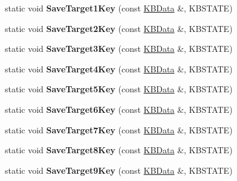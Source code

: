 \begin{DoxyCompactItemize}
\item 
static void {\bfseries Save\+Target1\+Key} (const \hyperlink{classKBData}{K\+B\+Data} \&, K\+B\+S\+T\+A\+TE)\hypertarget{classFireKeyboard_af458e85fe3e262506f9a80bd349af5ac}{}\label{classFireKeyboard_af458e85fe3e262506f9a80bd349af5ac}

\item 
static void {\bfseries Save\+Target2\+Key} (const \hyperlink{classKBData}{K\+B\+Data} \&, K\+B\+S\+T\+A\+TE)\hypertarget{classFireKeyboard_a783bca6e88df52b382c6bcb89835b9d7}{}\label{classFireKeyboard_a783bca6e88df52b382c6bcb89835b9d7}

\item 
static void {\bfseries Save\+Target3\+Key} (const \hyperlink{classKBData}{K\+B\+Data} \&, K\+B\+S\+T\+A\+TE)\hypertarget{classFireKeyboard_a0152e5876856c5861f7dd6464e6aa2b1}{}\label{classFireKeyboard_a0152e5876856c5861f7dd6464e6aa2b1}

\item 
static void {\bfseries Save\+Target4\+Key} (const \hyperlink{classKBData}{K\+B\+Data} \&, K\+B\+S\+T\+A\+TE)\hypertarget{classFireKeyboard_a4a150da27db1f4a7bd3bb33a3b29ccf5}{}\label{classFireKeyboard_a4a150da27db1f4a7bd3bb33a3b29ccf5}

\item 
static void {\bfseries Save\+Target5\+Key} (const \hyperlink{classKBData}{K\+B\+Data} \&, K\+B\+S\+T\+A\+TE)\hypertarget{classFireKeyboard_a667d959afb31e6c34a17fac651de7568}{}\label{classFireKeyboard_a667d959afb31e6c34a17fac651de7568}

\item 
static void {\bfseries Save\+Target6\+Key} (const \hyperlink{classKBData}{K\+B\+Data} \&, K\+B\+S\+T\+A\+TE)\hypertarget{classFireKeyboard_a8fc38fd002666d37dfe7eda5b54a5d0c}{}\label{classFireKeyboard_a8fc38fd002666d37dfe7eda5b54a5d0c}

\item 
static void {\bfseries Save\+Target7\+Key} (const \hyperlink{classKBData}{K\+B\+Data} \&, K\+B\+S\+T\+A\+TE)\hypertarget{classFireKeyboard_afe565d60878d1ba628418b8f4652d843}{}\label{classFireKeyboard_afe565d60878d1ba628418b8f4652d843}

\item 
static void {\bfseries Save\+Target8\+Key} (const \hyperlink{classKBData}{K\+B\+Data} \&, K\+B\+S\+T\+A\+TE)\hypertarget{classFireKeyboard_abef242c08d7ed43265a3a485942a234a}{}\label{classFireKeyboard_abef242c08d7ed43265a3a485942a234a}

\item 
static void {\bfseries Save\+Target9\+Key} (const \hyperlink{classKBData}{K\+B\+Data} \&, K\+B\+S\+T\+A\+TE)\hypertarget{classFireKeyboard_a141ee959a90713faf3eb1d0bd413b0ae}{}\label{classFireKeyboard_a141ee959a90713faf3eb1d0bd413b0ae}


\end{DoxyCompactItemize}
